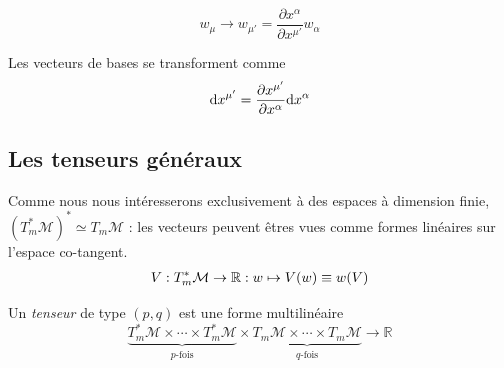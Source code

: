  \begin{equation}
     \boxed{w_\mu \longrightarrow w_{\mu '} = \frac{\partial x^{\alpha }}{\partial x^{\mu '}} w_{\alpha}}
 \end{equation}

Les vecteurs de bases se transforment comme
\begin{equation}
    \mathrm{d} x^{\mu'} = \frac{\partial x^{\mu'}}{\partial x^{\alpha}} \mathrm{d} x^{\alpha}
\end{equation}
\subsection{Les tenseurs généraux}
Comme nous nous intéresserons exclusivement à des espaces à dimension finie, $(T^*_m \mathcal{M})^* \simeq T_m \mathcal{M}$ : les vecteurs peuvent êtres vues comme formes linéaires sur l'espace co-tangent.
\begin{align}
    V: T^*_m \mathcal{M} \to  \mathbb{R} : w  \mapsto V(w) \equiv w(V )
\end{align}
\begin{theoremframe}
    \begin{rap}
        \label{rap:tenseur}
        Un \emph{tenseur} de type $(p,q)$ est une forme multilinéaire 
        \begin{equation}
            \underbrace{T^*_{m}\mathcal{M} \times \cdots \times T^*_{m}\mathcal{M}}_\text{$p$-fois} \times \underbrace{T_{m}\mathcal{M} \times \cdots \times T_{m}\mathcal{M}}_\text{$q$-fois}  \longrightarrow \mathbb{R}
        \end{equation}
    \end{rap}
\end{theoremframe}
